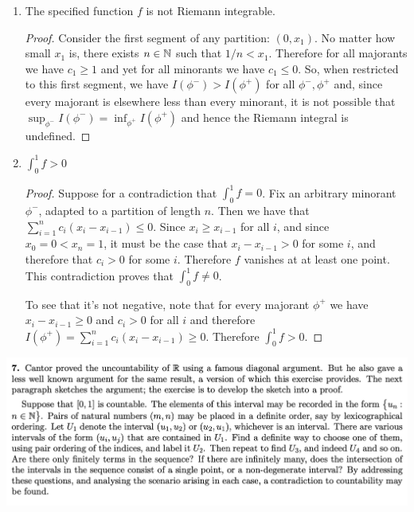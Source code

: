 \begin{enumerate}
\item
  \begin{claim*}
    The specified function $f$ is not Riemann integrable.
  \end{claim*}

  \begin{proof}
    Consider the first segment of any partition: $(0, x_1)$. No matter how small $x_1$ is, there
    exists $n \in \mathbb{N}$ such that $1/n < x_1$. Therefore for all majorants we have $c_1 \geq 1$ and yet for all
    minorants we have $c_1 \leq 0$. So, when restricted to this first segment, we have $I(\phi^-) > I(\phi^+)$
    for all $\phi^-, \phi^+$ and, since every majorant is elsewhere less than every minorant, it is not
    possible that $\sup_{\phi^-} I(\phi^-) = \inf_{\phi^+} I(\phi^+)$ and hence the Riemann integral is
    undefined.
  \end{proof}

\item
  \begin{claim*}
    $\int_0^1 f > 0$
  \end{claim*}
  \begin{proof}
    Suppose for a contradiction that $\int_0^1 f = 0$. Fix an arbitrary minorant $\phi^-$, adapted to a
    partition of length $n$. Then we have that $\sum_{i=1}^n c_i(x_i - x_{i-1}) \leq 0$.
    Since $x_i \geq x_{i-1}$ for all $i$, and since $x_0 = 0 < x_n = 1$, it must be the case
    that $x_i - x_{i-1} > 0$ for some $i$, and therefore that $c_i > 0$ for some $i$. Therefore $f$ vanishes at
    at least one point. This contradiction proves that $\int_0^1 f \neq 0$.

    To see that it's not negative, note that for every majorant $\phi^+$ we have $x_i - x_{i-1} \geq 0$
    and $c_i > 0$ for all $i$ and therefore $I(\phi^+) = \sum_{i=1}^n c_i(x_i - x_{i-1}) \geq 0$. Therefore $\int_0^1 f > 0$.
  \end{proof}

\end{enumerate}

\newpage
\begin{mdframed}
  \includegraphics[width=400pt]{img/analysis--berkeley-202a--homework-1-a577.png}
\end{mdframed}


